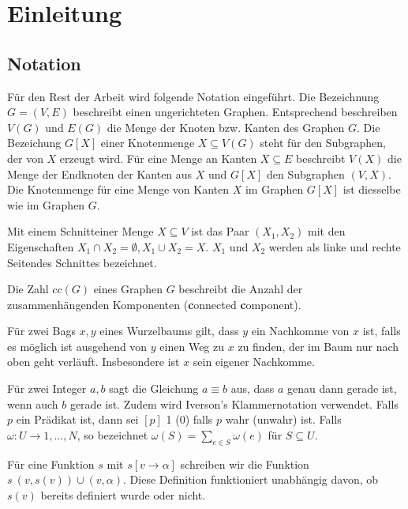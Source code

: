 %
%
%
\chapter{Einleitung}
\label{c:intro} %

\section{Notation}
\label{sec:intro_not}
Für den Rest der Arbeit wird folgende Notation eingeführt. Die Bezeichnung $G=(V,E)$ beschreibt einen ungerichteten Graphen. Entsprechend beschreiben $V(G)$ und $E(G)$ die Menge der Knoten bzw. Kanten des Graphen $G$. Die Bezeichung $G[X]$ einer Knotenmenge $X \subseteq V(G)$ steht für den Subgraphen, der von $X$ erzeugt wird. Für eine Menge an Kanten $X \subseteq E$ beschreibt $V(X)$ die Menge der Endknoten der Kanten aus $X$ und $G[X]$ den Subgraphen $(V,X)$. Die Knotenmenge für eine Menge von Kanten $X$ im Graphen $G[X]$ ist diesselbe wie im Graphen $G$.

Mit einem \glqq Schnitt\grqq einer Menge $X \subseteq V$ ist das Paar $(X_1,X_2)$ mit den Eigenschaften $X_1 \cap X_2 = \emptyset,X_1 \cup X_2 = X$. $X_1$ und $X_2$ werden als linke und rechte \glqq Seiten\grqq des Schnittes bezeichnet.

Die Zahl $cc(G)$ eines Graphen $G$ beschreibt die Anzahl der zusammenhängenden Komponenten (\glqq \textbf{c}onnected \textbf{c}omponent\grqq).

Für zwei Bags $x,y$ eines Wurzelbaums gilt, dass $y$ ein Nachkomme von $x$ ist, falls es möglich ist ausgehend von $y$ einen Weg zu $x$ zu finden, der im Baum nur nach oben geht verläuft. Insbesondere ist $x$ sein eigener Nachkomme.

Für zwei Integer $a,b$ sagt die Gleichung $a \equiv b$ aus, dass $a$ genau dann gerade ist, wenn auch $b$ gerade ist.
Zudem wird Iverson's Klammernotation verwendet. Falls $p$ ein Prädikat ist, dann sei $[p]$ 1 (0) falls $p$ wahr (unwahr) ist.
Falls $\omega:U\rightarrow {1,\dots,N}$, so bezeichnet $\omega(S)=\sum_{e\in S} \omega(e)$ für $S \subseteq U$.

Für eine Funktion $s$ mit $s[v \rightarrow \alpha]$ schreiben wir die Funktion $s \ {(v,s(v))}\cup{(v,\alpha)}$. Diese Definition funktioniert unabhängig davon, ob $s(v)$ bereits definiert wurde oder nicht.
